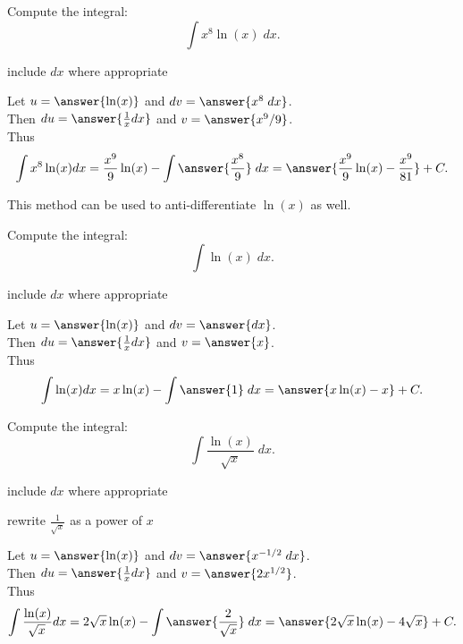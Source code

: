 \documentclass{ximera}
\begin{document}
\begin{problem} 
  Compute the integral:
  \[
  \int x^8 \ln(x) \;dx.
  \]
  
  \begin{hint}
      include $dx$ where appropriate
  \end{hint}
  Let $u = \answer{\ln(x)}$   and   $dv = \answer{x^8 \;dx}$.\\
  Then $du = \answer{\frac{1}{x} dx}$   and   $v = \answer{x^9/9}$.\\
  Thus 
  \[
  \int x^8 \ln(x) dx = \frac{x^9}{9}\ln(x) - \int \answer{\frac{x^8}{9}} \;dx = \answer{\frac{x^9}{9}\ln(x) -\frac{x^9}{81}} + C.
  \]

\end{problem}

This method can be used to anti-differentiate $\ln(x)$ as well.


\begin{problem} 
  Compute the integral:
  \[
  \int \ln(x) \;dx.
  \]
  
  \begin{hint}
      include $dx$ where appropriate
  \end{hint}
  Let $u = \answer{\ln(x)}$   and   $dv = \answer{dx}$.\\
  Then $du = \answer{\frac{1}{x} dx}$   and   $v = \answer{x}$.\\
  Thus 
  \[
  \int  \ln(x) dx = x\ln(x) - \int \answer{1} \;dx = \answer{x\ln(x) -x} + C.
  \]

\end{problem}

\begin{problem} 
  Compute the integral:
  \[
  \int \frac{\ln(x)}{\sqrt x} \;dx.
  \]
  
  \begin{hint}
      include $dx$ where appropriate
  \end{hint}
  \begin{hint}
      rewrite $\frac{1}{\!\sqrt x}$ as a power of $x$
  \end{hint}
  Let $u = \answer{\ln(x)}$   and   $dv = \answer{x^{-1/2} \;dx}$.\\
  Then $du = \answer{\frac{1}{x} dx}$   and   $v = \answer{2x^{1/2}}$.\\
  Thus 
  \[
  \int \frac{\ln(x)}{\!\sqrt x} dx = 2\sqrt x \ln(x) - \int \answer{\frac{2}{\sqrt x}} \;dx = \answer{2\sqrt x \ln(x) -4\sqrt x} + C.
  \]

\end{problem}
\end{document}
